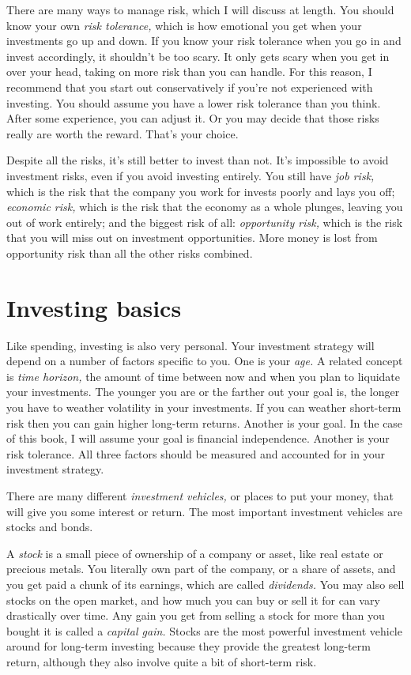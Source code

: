 There are many ways to manage risk, which I will discuss at length. You should know your own \emph{risk tolerance,} which is how emotional you get when your investments go up and down. If you know your risk tolerance when you go in and invest accordingly, it shouldn't be too scary. It only gets scary when you get in over your head, taking on more risk than you can handle. For this reason, I recommend that you start out conservatively if you're not experienced with investing. You should assume you have a lower risk tolerance than you think. After some experience, you can adjust it. Or you may decide that those risks really are worth the reward. That's your choice.

Despite all the risks, it's still better to invest than not. It's impossible to avoid investment risks, even if you avoid investing entirely. You still have \emph{job risk,} which is the risk that the company you work for invests poorly and lays you off; \emph{economic risk,} which is the risk that the economy as a whole plunges, leaving you out of work entirely; and the biggest risk of all: \emph{opportunity risk,} which is the risk that you will miss out on investment opportunities. More money is lost from opportunity risk than all the other risks combined.

\section{Investing basics}
Like spending, investing is also very personal. Your investment strategy will depend on a number of factors specific to you. One is your \emph{age.} A related concept is \emph{time horizon,} the amount of time between now and when you plan to liquidate your investments. The younger you are or the farther out your goal is, the longer you have to weather volatility in your investments. If you can weather short-term risk then you can gain higher long-term returns. Another is your goal. In the case of this book, I will assume your goal is financial independence. Another is your risk tolerance. All three factors should be measured and accounted for in your investment strategy.

There are many different \emph{investment vehicles,} or places to put your money, that will give you some interest or return. The most important investment vehicles are stocks and bonds.

A \emph{stock} is a small piece of ownership of a company or asset, like real estate or precious metals. You literally own part of the company, or a share of assets, and you get paid a chunk of its earnings, which are called \emph{dividends.} You may also sell stocks on the open market, and how much you can buy or sell it for can vary drastically over time. Any gain you get from selling a stock for more than you bought it is called a \emph{capital gain.} Stocks are the most powerful investment vehicle around for long-term investing because they provide the greatest long-term return, although they also involve quite a bit of short-term risk.

